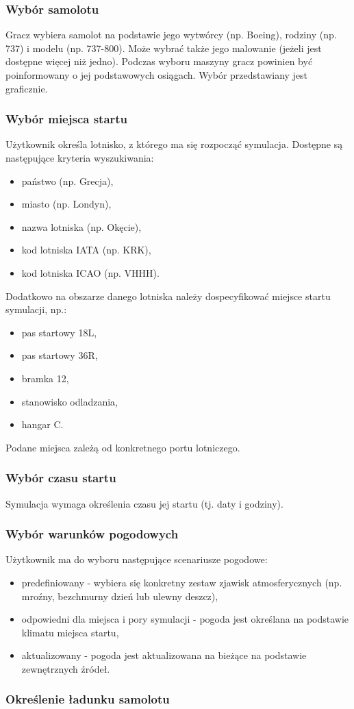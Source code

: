 \documentclass{mwrep}
\begin{document}
\subsubsection{Wybór samolotu}
Gracz wybiera samolot na podstawie jego wytwórcy (np. Boeing), rodziny (np. 737) i modelu (np. 737-800). Może wybrać także jego malowanie (jeżeli jest dostępne więcej niż jedno). Podczas wyboru maszyny gracz powinien być poinformowany o jej podstawowych osiągach. Wybór przedstawiany jest graficznie.

\subsubsection{Wybór miejsca startu}
Użytkownik określa lotnisko, z którego ma się rozpocząć symulacja. Dostępne są następujące kryteria wyszukiwania:
\begin{itemize}
\item państwo (np. Grecja),
\item miasto (np. Londyn),
\item nazwa lotniska (np. Okęcie),
\item kod lotniska IATA (np. KRK),
\item kod lotniska ICAO (np. VHHH).
\end{itemize}
Dodatkowo na obszarze danego lotniska należy dospecyfikować miejsce startu symulacji, np.:
\begin{itemize}
\item pas startowy 18L,
\item pas startowy 36R,
\item bramka 12,
\item stanowisko odladzania,
\item hangar C.
\end{itemize}
Podane miejsca zależą od konkretnego portu lotniczego.

\subsubsection{Wybór czasu startu}
Symulacja wymaga określenia czasu jej startu (tj. daty i godziny).

\subsubsection{Wybór warunków pogodowych}
Użytkownik ma do wyboru następujące scenariusze pogodowe:
\begin{itemize}
\item predefiniowany - wybiera się konkretny zestaw zjawisk atmosferycznych (np. mroźny, bezchmurny dzień lub ulewny deszcz),
\item odpowiedni dla miejsca i pory symulacji - pogoda jest określana na podstawie klimatu miejsca startu,
\item aktualizowany - pogoda jest aktualizowana na bieżące na podstawie zewnętrznych źródeł.
\end{itemize}

\subsubsection{Określenie ładunku samolotu}
\end{document}
